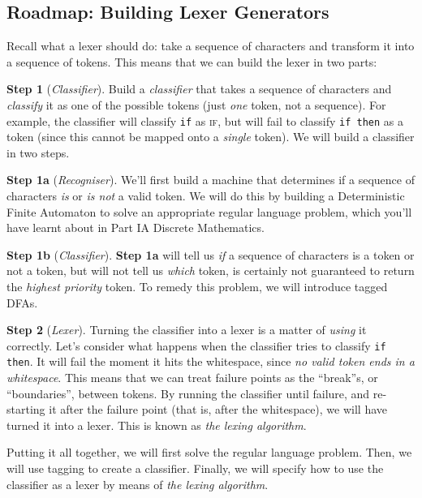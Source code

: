 \subsection{Roadmap: Building Lexer Generators}
Recall what a lexer should do: take a sequence of characters and transform it into a sequence of tokens. This means that we can build the lexer in two parts:

\textbf{Step 1} (\textit{Classifier}). Build a \textit{classifier} that takes a sequence of characters and \emph{classify} it as one of the possible tokens (just \emph{one} token, not a sequence). For example, the classifier will classify \texttt{if} as \textsc{if}, but will fail to classify \texttt{if then} as a token (since this cannot be mapped onto a \emph{single} token). We will build a classifier in two steps.

\begin{addmargin}[1cm]{0cm}
\textbf{Step 1a} (\textit{Recogniser}). We'll first build a machine that determines if a sequence of characters \textit{is} or \textit{is not} a valid token. We will do this by building a Deterministic Finite Automaton to solve an appropriate regular language problem, which you'll have learnt about in {\sffamily Part IA Discrete Mathematics}.

\textbf{Step 1b} (\textit{Classifier}). \textbf{Step 1a} will tell us \emph{if} a sequence of characters is a token or not a token, but will not tell us \emph{which} token, is certainly not guaranteed to return the \emph{highest priority} token. To remedy this problem, we will introduce tagged DFAs. 
\end{addmargin}

\textbf{Step 2} (\textit{Lexer}). Turning the classifier into a lexer is a matter of \textit{using} it correctly. Let's consider what happens when the classifier tries to classify \texttt{if then}. It will fail the moment it hits the whitespace, since \emph{no valid token ends in a whitespace}. This means that we can treat failure points as the ``break''s, or ``boundaries'', between tokens. By running the classifier until failure, and re-starting it after the failure point (that is, after the whitespace), we will have turned it into a lexer. This is known as \emph{the lexing algorithm}. 


Putting it all together, we will first solve the regular language problem. Then, we will use tagging to create a classifier. Finally, we will specify how to use the classifier as a lexer by means of \emph{the lexing algorithm}.

